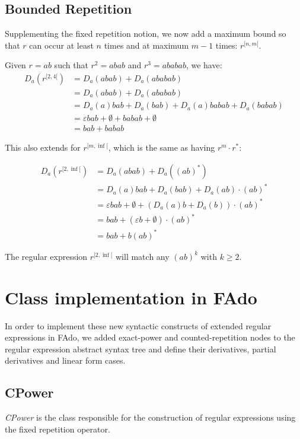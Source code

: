\subsection{Bounded Repetition}
Supplementing the fixed repetition notion, we now add a maximum bound so that $r$ can occur at least $n$ times and at maximum $m-1$ times: $r^{[n,m[}$.

Given $r = ab$ such that $r^2 = abab$ and $r^3 = ababab$, we have:
\begin{align*}
	D_a(r^{[2,4[}) &= D_a(abab) + D_a(ababab) \\
	&= D_a(abab) + D_a(ababab) \\
	&= D_a(a)bab + D_a(bab) + D_a(a)babab + D_a(babab) \\
	&= \varepsilon bab + \emptyset + babab + \emptyset \\
	&= bab + babab
\end{align*}

This also extends for $r^{[m, \inf[}$, which is the same as having $r^m \cdot r^*$:

\begin{align*}
	D_a(r^{[2,\inf[}) &= D_a(abab) + D_a((ab)^*) \\
	&= D_a(a)bab + D_a(bab) + D_a(ab)\cdot(ab)^* \\
	&= \varepsilon bab + \emptyset + (D_a(a)b + D_a(b)) \cdot (ab)^* \\
	&= bab + (\varepsilon b + \emptyset) \cdot (ab)^* \\
	&= bab + b(ab)^*
\end{align*}


The regular expression $r^{[2, \inf[}$ will match any $(ab)^k$ with $k \geq 2$.




\section{Class implementation in FAdo}
In order to implement these new syntactic constructs of extended regular expressions in FAdo, we added exact-power and counted-repetition nodes to the regular expression abstract syntax tree and define their derivatives, partial derivatives and linear form cases.

\subsection{CPower}
\textit{CPower} is the class responsible for the construction of regular expressions using the fixed repetition operator.

